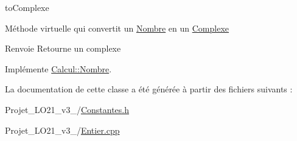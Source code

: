 to\-Complexe 

Méthode virtuelle qui convertit un \hyperlink{class_calcul_1_1_nombre}{Nombre} en un \hyperlink{class_calcul_1_1_complexe}{Complexe} \begin{DoxyReturn}{Renvoie}
Retourne un complexe 
\end{DoxyReturn}


Implémente \hyperlink{class_calcul_1_1_nombre_a01b0c03ea3d7493e6d853768cce6f096}{Calcul\-::\-Nombre}.



La documentation de cette classe a été générée à partir des fichiers suivants \-:\begin{DoxyCompactItemize}
\item 
Projet\-\_\-\-L\-O21\-\_\-v3\-\_/\hyperlink{_constantes_8h}{Constantes.\-h}\item 
Projet\-\_\-\-L\-O21\-\_\-v3\-\_/\hyperlink{_entier_8cpp}{Entier.\-cpp}\end{DoxyCompactItemize}
